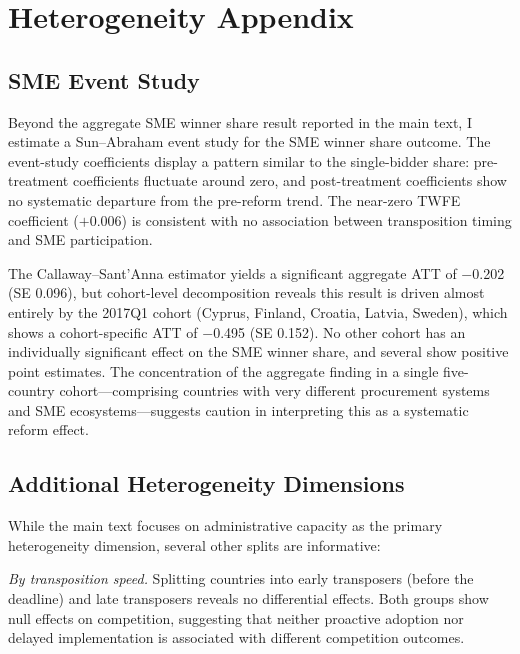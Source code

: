 \documentclass[12pt]{article}
\begin{document}
\section{Heterogeneity Appendix}
\label{app:heterogeneity}

\subsection{SME Event Study}

Beyond the aggregate SME winner share result reported in the main text, I estimate a Sun--Abraham event study for the SME winner share outcome. The event-study coefficients display a pattern similar to the single-bidder share: pre-treatment coefficients fluctuate around zero, and post-treatment coefficients show no systematic departure from the pre-reform trend. The near-zero TWFE coefficient ($+$0.006) is consistent with no association between transposition timing and SME participation.

The Callaway--Sant'Anna estimator yields a significant aggregate ATT of $-$0.202 (SE 0.096), but cohort-level decomposition reveals this result is driven almost entirely by the 2017Q1 cohort (Cyprus, Finland, Croatia, Latvia, Sweden), which shows a cohort-specific ATT of $-$0.495 (SE 0.152). No other cohort has an individually significant effect on the SME winner share, and several show positive point estimates. The concentration of the aggregate finding in a single five-country cohort---comprising countries with very different procurement systems and SME ecosystems---suggests caution in interpreting this as a systematic reform effect.

\subsection{Additional Heterogeneity Dimensions}

While the main text focuses on administrative capacity as the primary heterogeneity dimension, several other splits are informative:

\textit{By transposition speed.} Splitting countries into early transposers (before the deadline) and late transposers reveals no differential effects. Both groups show null effects on competition, suggesting that neither proactive adoption nor delayed implementation is associated with different competition outcomes.
\end{document}
